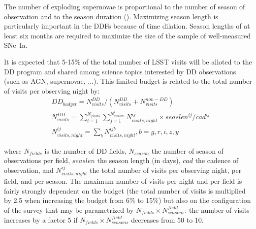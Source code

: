 \documentclass[skiphelvet,twocolumn]{aastex63}
\newcommand{\sne}{{SNe~Ia}}
\begin{document}
\par
The number of exploding supernovae is proportional to the number of season of observation and to the season duration (\citealt{perrett}). Maximizing season length is particularly important in the DDFs because of time dilation. Season lengths of at least six months are required to maximize the size of the sample of well-measured \sne.
\par
It is expected that 5-15$\%$ of the total number of LSST visits will be alloted to the DD program and shared among science topics interested by DD observations (such as AGN, supernovae, ...).  This limited budget is related to the total number of visits per observing night by:
\begin{equation}\label{eq:ddbudget}
\begin{aligned}
&DD_{budget} = N_{visits}^{DD}/(N_{visits}^{DD}+ N_{visits}^{non-DD})\\
 &N_{visits}^{DD} = \sum_{i=1}^{N_{fields}} \sum_{ j=1}^{N_{season}^i} N_{visits,night}^{ij}\times seaslen^{ij}/cad^{ij} \\
 & N_{visits,night}^{ij} =  \sum_{b} N_{visits,night}^{ijb}   , b=g,r,i,z,y
 \end{aligned}
 \end{equation}

where $N_{fields}$ is the number of DD fields, $N_{season}$ the number of season of observations per field, $seaslen$ the season length (in days), $cad$ the cadence of observation, and $N_{visits, night}^{ij}$ the total number of visits per observing night, per field, and per season. The maximum number of visits per night and per field is fairly strongly dependent on the budget (the total number of visits is multiplied by 2.5 when increasing the budget from 6\% to 15\%) but also on the configuration of the survey that may be parametrized by $N_{fields}\times N_{seasons}^{field}$: the number of visits increases by a factor 5 if $N_{fields}\times N_{seasons}^{field}$ decreases from 50 to 10.
\end{document}
